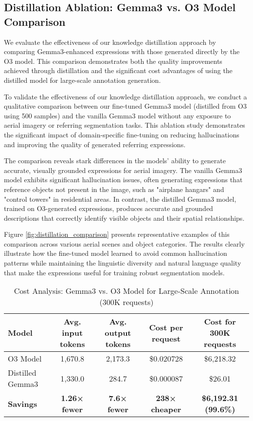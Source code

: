 \subsection{Distillation Ablation: Gemma3 vs. O3 Model Comparison}
\label{subsec:distillation_ablation}

We evaluate the effectiveness of our knowledge distillation approach by comparing Gemma3-enhanced expressions with those generated directly by the O3 model. This comparison demonstrates both the quality improvements achieved through distillation and the significant cost advantages of using the distilled model for large-scale annotation generation.

To validate the effectiveness of our knowledge distillation approach, we conduct a qualitative comparison between our fine-tuned Gemma3 model (distilled from O3 using 500 samples) and the vanilla Gemma3 model without any exposure to aerial imagery or referring segmentation tasks. This ablation study demonstrates the significant impact of domain-specific fine-tuning on reducing hallucinations and improving the quality of generated referring expressions.

The comparison reveals stark differences in the models' ability to generate accurate, visually grounded expressions for aerial imagery. The vanilla Gemma3 model exhibits significant hallucination issues, often generating expressions that reference objects not present in the image, such as "airplane hangars" and "control towers" in residential areas. In contrast, the distilled Gemma3 model, trained on O3-generated expressions, produces accurate and grounded descriptions that correctly identify visible objects and their spatial relationships.

Figure \ref{fig:distillation_comparison} presents representative examples of this comparison across various aerial scenes and object categories. The results clearly illustrate how the fine-tuned model learned to avoid common hallucination patterns while maintaining the linguistic diversity and natural language quality that make the expressions useful for training robust segmentation models.

\begin{table*}[t]
\centering
\caption{Cost Analysis: Gemma3 vs. O3 Model for Large-Scale Annotation (300K requests)}
\label{tab:cost_comparison}
\begin{tabular}{@{}lcccc@{}}
\toprule
\textbf{Model} & \textbf{Avg. input tokens} & \textbf{Avg. output tokens} & \textbf{Cost per request} & \textbf{Cost for 300K requests} \\
\midrule
O3 Model & 1,670.8 & 2,173.3 & \$0.020728 & \$6,218.32 \\
Distilled Gemma3 & 1,330.0 & 284.7 & \$0.000087 & \$26.01 \\
\midrule
\textbf{Savings} & \textbf{1.26× fewer} & \textbf{7.6× fewer} & \textbf{238× cheaper} & \textbf{\$6,192.31 (99.6\%)} \\
\bottomrule
\end{tabular}
\end{table*}

